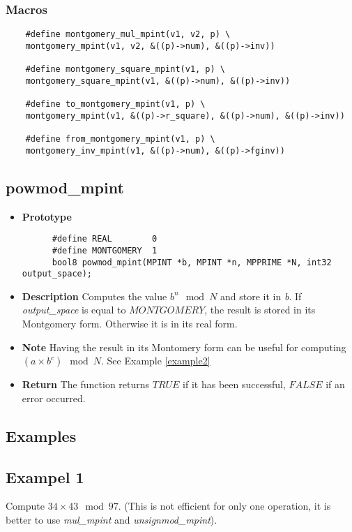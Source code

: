 \documentclass[10pt,a4paper]{article}
\begin{document}
  \subsubsection{Macros} \label{macro}
  
  \begin{lstlisting}
    #define montgomery_mul_mpint(v1, v2, p) \
    montgomery_mpint(v1, v2, &((p)->num), &((p)->inv))
    
    #define montgomery_square_mpint(v1, p) \
    montgomery_square_mpint(v1, &((p)->num), &((p)->inv))
    
    #define to_montgomery_mpint(v1, p) \
    montgomery_mpint(v1, &((p)->r_square), &((p)->num), &((p)->inv))
    
    #define from_montgomery_mpint(v1, p) \
    montgomery_inv_mpint(v1, &((p)->num), &((p)->fginv))
  \end{lstlisting}
  
  \subsection{powmod\_mpint}
  
  \begin{itemize}
    \item [] \textbf{Prototype}
    \begin{lstlisting}
      #define REAL        0
      #define MONTGOMERY  1
      bool8 powmod_mpint(MPINT *b, MPINT *n, MPPRIME *N, int32 output_space);
    \end{lstlisting}
    \item [] \textbf{Description} Computes the value $b^{n} \mod N$ and store it in \textit{b}. If \textit{output\_space} is equal to $MONTGOMERY$, the result is stored in its Montgomery form.
    Otherwise it is in its real form.
    \item [] \textbf{Note} Having the result in its Montomery form can be useful for computing $(a \times b^{c}) \mod N$. See Example \ref{example2}
    \item [] \textbf{Return} The function returns $TRUE$ if it has been successful, $FALSE$ if an error occurred.
  \end{itemize}
  
  \subsection{Examples} 
  
  
  \subsection{Exampel 1} \label{example}
  Compute $34 \times 43 \mod 97$. (This is not efficient for only one operation, it is better to use \textit{mul\_mpint} and \textit{unsignmod\_mpint}).
  
\end{document}
